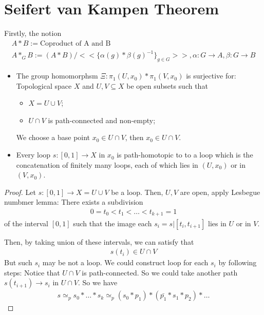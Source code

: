 \documentclass[Total.tex]{subfiles}
\begin{document}
		\section{Seifert van Kampen Theorem}
			Firstly, the notion
			\begin{gather*}
				A*B:=\mbox{Coproduct of A and B}\\
				A*_G B:=(A*B)/<<\{\alpha(g)*\beta(g)^{-1}\}_{g\in G}>>,\alpha:G\rightarrow A,\beta:G\rightarrow B
			\end{gather*}
			\begin{center}
			\end{center}
			\begin{lemma}
				\begin{itemize}
					\item The group homomorphsm $\Xi:\pi_1(U,x_0)*\pi_1(V,x_0)$ is surjective for: Topological space $X$ and $U,V\subseteq X$ be open subsets such that
					\begin{itemize}
						\item $X=U\cup V$;
						\item $U\cap V$ is path-connected and non-empty;
					\end{itemize}
					We choose a base point $x_0\in U\cap V$, then $x_0\in U\cap V$. 
					\item Every loop $s:[0,1]\rightarrow X$ in $x_0$ is path-homotopic to to a loop which is the concatenation of finitely many loops, each of which lies in $(U,x_0)$ or in $(V,x_0)$.
				\end{itemize}
			\end{lemma}
			\begin{proof}
				Let $s:[0,1]\rightarrow X=U\cup V$ be a loop. Then, $U,V$ are open, apply Lesbegue numbmer lemma: There exists a subdivision
				\begin{gather*}
					0=t_0<t_1<\dots<t_{k+1}=1	
				\end{gather*}
				of the interval $[0,1]$ such that the image each $s_i=s|[t_i,t_{i+1}]$ lies in $U$ or in $V$. 
				
				Then, by taking union of these intervals, we can satisfy that
				\begin{gather*}
					s(t_i)\in U\cap V
				\end{gather*}
				But such $s_i$ may be not a loop. We could construct loop for each $s_i$ by following steps: Notice that $U\cap V$ is path-connected. So we could take another path $s(t_{i+1})\rightarrow s_i$ in $U\cap V$. So we have
				\begin{gather*}
					s\simeq_p s_0*\dots*s_k\simeq_p (s_0*p_1)*(\bar{p_1}*s_1*p_2)*\dots 
				\end{gather*}
			\end{proof}
\end{document}
